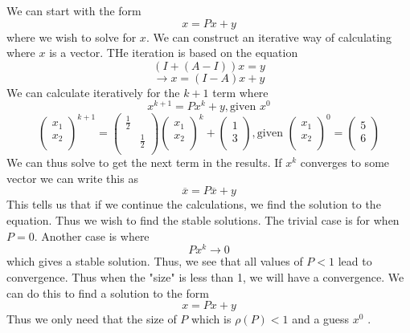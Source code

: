 \begin{remark}
    We can start with the form 
    \[
        x = Px +y 
    \]
    where we wish to solve for \(x\). We can construct an iterative way of calculating 
    where \(x\) is a vector. THe iteration is based on the equation 
    \[
        \left( I + (A-I) \right) x = y
    \]
    \[
        \to x = (I-A)x +y
    \]
    We can calculate iteratively for the \(k+1\) term where 
    \[
        x^{k+1} = Px^k +y, \text{given } x^0
    \]
    \[
        \begin{pmatrix}
             x_1 \\
             x_2  \\
        \end{pmatrix} ^{k+1}
        = 
        \begin{pmatrix}
            \frac{1}{2} &   \\
             &   \frac{1}{2}\\
        \end{pmatrix}
        \begin{pmatrix}
             x_1 \\
             x_2 \\
        \end{pmatrix}^k + 
        \begin{pmatrix}
              1 \\
              3 \\
        \end{pmatrix}, \text{given } \begin{pmatrix}
              x_1 \\
              x_2\\
        \end{pmatrix}^0 = \begin{pmatrix}
              5 \\
              6\\
        \end{pmatrix}
    \]
    We can thus solve to get the next term in the results. If \(x^k\) converges to some vector 
    we can write this as 
    \[
        \overline{x}  = P \overline{x} + y 
    \]
    This tells us that if we continue the calculations, we find the solution to the equation. Thus 
    we wish to find the stable solutions. The trivial case is for when \(P = 0 \). Another case 
    is where 
    \[
        P x^k \to 0 
    \]
    which gives a stable solution. Thus, we see that all values of \(P < 1\) lead to 
    convergence. Thus when the "size" is less than 1, we will have a convergence. We can do this 
    to find a solution to the form 
    \[
        x = Px +y
    \]
    Thus we only need that the size of \(P \) which is \(\rho (P) < 1\) and a guess 
    \(x^0\) . 
\end{remark}
